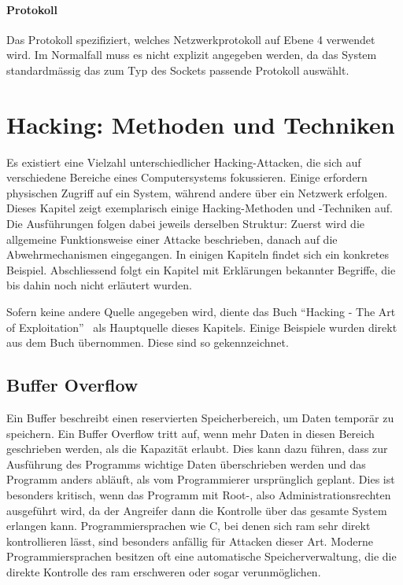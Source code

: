 \documentclass[11pt, a4paper]{article}
\begin{document}
\paragraph{Protokoll}
Das Protokoll spezifiziert, welches Netzwerkprotokoll auf Ebene 4 verwendet wird. Im Normalfall muss es nicht explizit angegeben werden, da das System standardmässig das zum Typ des Sockets passende Protokoll auswählt.

\newpage
\section{Hacking: Methoden und Techniken}\label{sec:methoden-und-techniken}
Es existiert eine Vielzahl unterschiedlicher Hacking-Attacken, die sich auf verschiedene Bereiche eines Computersystems fokussieren. Einige erfordern physischen Zugriff auf ein System, während andere über ein Netzwerk erfolgen. Dieses Kapitel zeigt exemplarisch einige Hacking-Methoden und -Techniken auf. Die Ausführungen folgen dabei jeweils derselben Struktur: Zuerst wird die allgemeine Funktionsweise einer Attacke beschrieben, danach auf die Abwehrmechanismen eingegangen. In einigen Kapiteln findet sich ein konkretes Beispiel. Abschliessend folgt ein Kapitel mit Erklärungen bekannter Begriffe, die bis dahin noch nicht erläutert wurden.

Sofern keine andere Quelle angegeben wird, diente das Buch ``Hacking - The Art of Exploitation''~\cite{erickson2008hacking} als Hauptquelle dieses Kapitels. Einige Beispiele wurden direkt aus dem Buch übernommen. Diese sind so gekennzeichnet.

\subsection{Buffer Overflow}\label{subsec:buffer-overflow}
Ein Buffer beschreibt einen reservierten Speicherbereich, um Daten temporär zu speichern. Ein Buffer Overflow tritt auf, wenn mehr Daten in diesen Bereich geschrieben werden, als die Kapazität erlaubt. Dies kann dazu führen, dass zur Ausführung des Programms wichtige Daten überschrieben werden und das Programm anders abläuft, als vom Programmierer ursprünglich geplant. Dies ist besonders kritisch, wenn das Programm mit Root-, also Administrationsrechten ausgeführt wird, da der Angreifer dann die Kontrolle über das gesamte System erlangen kann. Programmiersprachen wie C, bei denen sich \gls{ram} sehr direkt kontrollieren lässt, sind besonders anfällig für Attacken dieser Art. Moderne Programmiersprachen besitzen oft eine automatische Speicherverwaltung, die die direkte Kontrolle des \gls{ram} erschweren oder sogar verunmöglichen.
\end{document}
